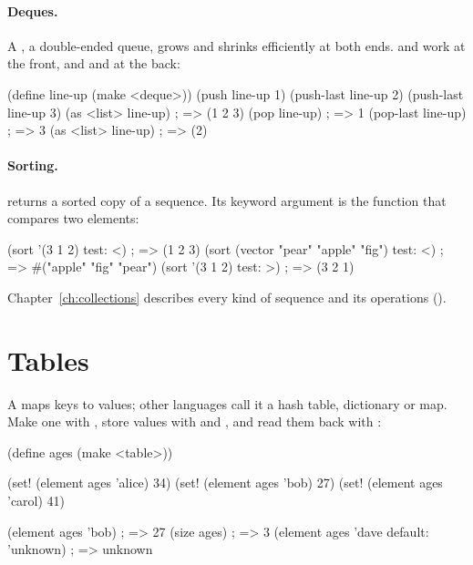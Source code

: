\paragraph{Deques.}
A , a double-ended queue, grows and shrinks efficiently at
both ends.  and  work at the front, and
 and  at the back:

\begin{dylan}
(define line-up (make <deque>))
(push line-up 1)
(push-last line-up 2)
(push-last line-up 3)
(as <list> line-up)             ; => (1 2 3)
(pop line-up)                   ; => 1
(pop-last line-up)              ; => 3
(as <list> line-up)             ; => (2)
\end{dylan}

\paragraph{Sorting.}
 returns a sorted copy of a sequence. Its  keyword
argument is the function that compares two elements:

\begin{dylan}
(sort '(3 1 2) test: <)                     ; => (1 2 3)
(sort (vector "pear" "apple" "fig") test: <) ; => #("apple" "fig" "pear")
(sort '(3 1 2) test: >)                     ; => (3 2 1)
\end{dylan}

Chapter~\ref{ch:collections} describes every kind of sequence and its
operations ().

\section{Tables}\label{sec:tut-tables}

A  maps keys to values; other languages call it a hash
table, dictionary or map. Make one with , store values with
 and , and read them back with :

\begin{dylan}
(define ages (make <table>))

(set! (element ages 'alice) 34)
(set! (element ages 'bob) 27)
(set! (element ages 'carol) 41)

(element ages 'bob)                     ; => 27
(size ages)                             ; => 3
(element ages 'dave default: 'unknown)  ; => unknown
\end{dylan}

